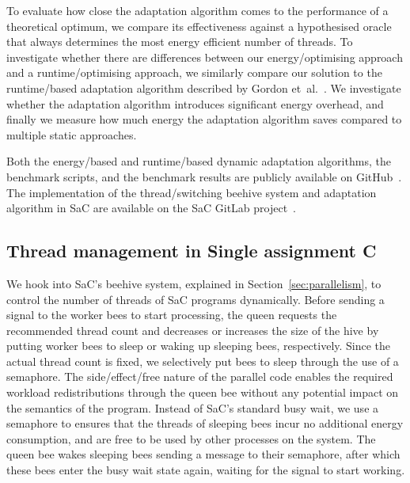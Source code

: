 To evaluate how close the adaptation algorithm comes to the performance of a theoretical optimum, we compare its effectiveness against a hypothesised oracle that always determines the most energy efficient number of threads.
To investigate whether there are differences between our energy\-/optimising approach and a runtime\-/optimising approach, we similarly compare our solution to the runtime\-/based adaptation algorithm described by Gordon et~al.~\cite{gordon2015dynamic}.
We investigate whether the adaptation algorithm introduces significant energy overhead, and finally we measure how much energy the adaptation algorithm saves compared to multiple static approaches.

Both the energy\-/based and runtime\-/based dynamic adaptation algorithms, the benchmark scripts, and the benchmark results are publicly available on GitHub~\cite{mtdynamic2024artefact}.
The implementation of the thread\-/switching beehive system and adaptation algorithm in SaC are available on the SaC GitLab project~\cite{sac2024repository}.

\subsection{Thread management in Single assignment C}\label{sec:implementation-sac}
We hook into SaC's beehive system, explained in Section~\ref{sec:parallelism}, to control the number of threads of SaC programs dynamically.
Before sending a signal to the worker bees to start processing, the queen requests the recommended thread count and decreases or increases the size of the hive by putting worker bees to sleep or waking up sleeping bees, respectively.
Since the actual thread count is fixed, we selectively put bees to sleep through the use of a semaphore.
The side\-/effect\-/free nature of the parallel code enables the required workload redistributions through the queen bee without any potential impact on the semantics of the program.
Instead of SaC's standard busy wait, we use a semaphore to ensures that the threads of sleeping bees incur no additional energy consumption, and are free to be used by other processes on the system.
The queen bee wakes sleeping bees sending a message to their semaphore, after which these bees enter the busy wait state again, waiting for the signal to start working.

